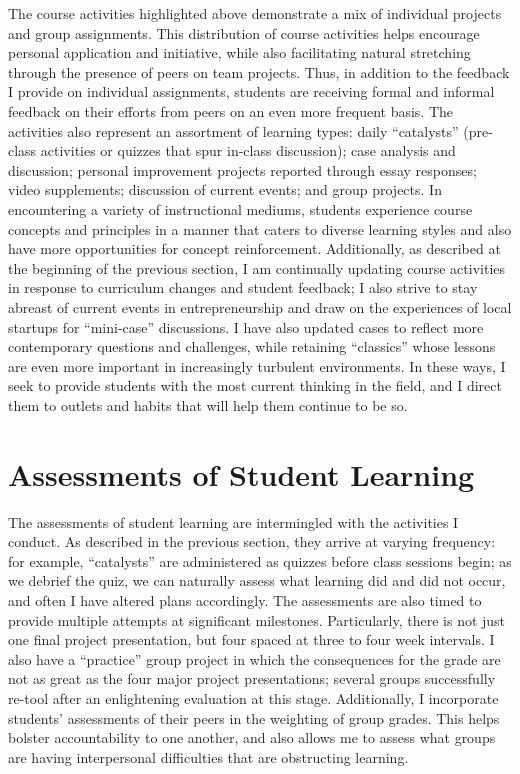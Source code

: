 \documentclass[11pt,article,oneside]{memoir}
\begin{document}
The course activities highlighted above demonstrate a mix of individual
projects and group assignments. This distribution of course activities
helps encourage personal application and initiative, while also
facilitating natural stretching through the presence of peers on team
projects. Thus, in addition to the feedback I provide on individual
assignments, students are receiving formal and informal feedback on
their efforts from peers on an even more frequent basis. The activities
also represent an assortment of learning types: daily
\enquote{catalysts} (pre-class activities or quizzes that spur in-class
discussion); case analysis and discussion; personal improvement projects
reported through essay responses; video supplements; discussion of
current events; and group projects. In encountering a variety of
instructional mediums, students experience course concepts and
principles in a manner that caters to diverse learning styles and also
have more opportunities for concept reinforcement. Additionally, as
described at the beginning of the previous section, I am continually
updating course activities in response to curriculum changes and student
feedback; I also strive to stay abreast of current events in
entrepreneurship and draw on the experiences of local startups for
\enquote{mini-case} discussions. I have also updated cases to reflect
more contemporary questions and challenges, while retaining
\enquote{classics} whose lessons are even more important in increasingly
turbulent environments. In these ways, I seek to provide students with
the most current thinking in the field, and I direct them to outlets and
habits that will help them continue to be so.

\section{Assessments of Student
Learning}\label{assessments-of-student-learning}

The assessments of student learning are intermingled with the activities
I conduct. As described in the previous section, they arrive at varying
frequency: for example, \enquote{catalysts} are administered as quizzes
before class sessions begin; as we debrief the quiz, we can naturally
assess what learning did and did not occur, and often I have altered
plans accordingly. The assessments are also timed to provide multiple
attempts at significant milestones. Particularly, there is not just one
final project presentation, but four spaced at three to four week
intervals. I also have a \enquote{practice} group project in which the
consequences for the grade are not as great as the four major project
presentations; several groups successfully re-tool after an enlightening
evaluation at this stage. Additionally, I incorporate students'
assessments of their peers in the weighting of group grades. This helps
bolster accountability to one another, and also allows me to assess what
groups are having interpersonal difficulties that are obstructing
learning.
\end{document}
